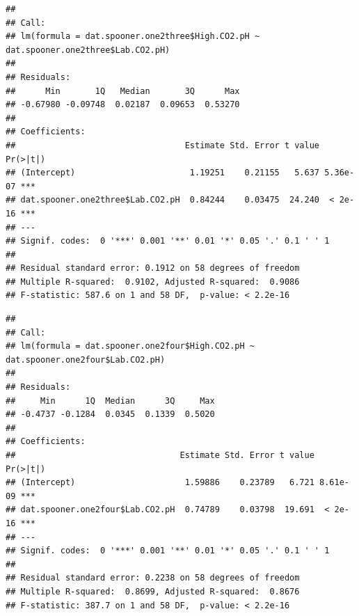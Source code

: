 \documentclass[]{article}
\newenvironment{Shaded}{\begin{snugshade}}{\end{snugshade}}
\newcommand{\KeywordTok}[1]{\textcolor[rgb]{0.13,0.29,0.53}{\textbf{#1}}}
\newcommand{\NormalTok}[1]{#1}
\newcommand{\OperatorTok}[1]{\textcolor[rgb]{0.81,0.36,0.00}{\textbf{#1}}}
\newcommand{\StringTok}[1]{\textcolor[rgb]{0.31,0.60,0.02}{#1}}
\begin{document}
\begin{verbatim}
## 
## Call:
## lm(formula = dat.spooner.one2three$High.CO2.pH ~ dat.spooner.one2three$Lab.CO2.pH)
## 
## Residuals:
##      Min       1Q   Median       3Q      Max 
## -0.67980 -0.09748  0.02187  0.09653  0.53270 
## 
## Coefficients:
##                                  Estimate Std. Error t value Pr(>|t|)    
## (Intercept)                       1.19251    0.21155   5.637 5.36e-07 ***
## dat.spooner.one2three$Lab.CO2.pH  0.84244    0.03475  24.240  < 2e-16 ***
## ---
## Signif. codes:  0 '***' 0.001 '**' 0.01 '*' 0.05 '.' 0.1 ' ' 1
## 
## Residual standard error: 0.1912 on 58 degrees of freedom
## Multiple R-squared:  0.9102, Adjusted R-squared:  0.9086 
## F-statistic: 587.6 on 1 and 58 DF,  p-value: < 2.2e-16
\end{verbatim}

\begin{Shaded}
\end{Shaded}

\begin{verbatim}
## 
## Call:
## lm(formula = dat.spooner.one2four$High.CO2.pH ~ dat.spooner.one2four$Lab.CO2.pH)
## 
## Residuals:
##     Min      1Q  Median      3Q     Max 
## -0.4737 -0.1284  0.0345  0.1339  0.5020 
## 
## Coefficients:
##                                 Estimate Std. Error t value Pr(>|t|)    
## (Intercept)                      1.59886    0.23789   6.721 8.61e-09 ***
## dat.spooner.one2four$Lab.CO2.pH  0.74789    0.03798  19.691  < 2e-16 ***
## ---
## Signif. codes:  0 '***' 0.001 '**' 0.01 '*' 0.05 '.' 0.1 ' ' 1
## 
## Residual standard error: 0.2238 on 58 degrees of freedom
## Multiple R-squared:  0.8699, Adjusted R-squared:  0.8676 
## F-statistic: 387.7 on 1 and 58 DF,  p-value: < 2.2e-16
\end{verbatim}
\end{document}
